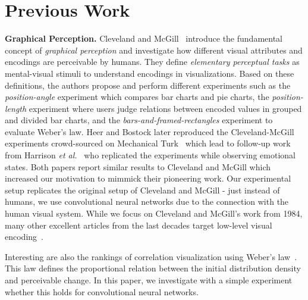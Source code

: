 \section{Previous Work}

\textbf{Graphical Perception.} Cleveland and McGill~\cite{cleveland_mcgill} introduce the fundamental concept of \emph{graphical perception} and investigate how different visual attributes and encodings are perceivable by humans. They define \emph{elementary perceptual tasks} as mental-visual stimuli to understand encodings in visualizations. Based on these definitions, the authors propose and perform different experiments such as the \emph{position-angle} experiment which compares bar charts and pie charts, the \emph{position-length} experiment where users judge relations between encoded values in grouped and divided bar charts, and the \emph{bars-and-framed-rectangles} experiment to evaluate Weber's law. Heer and Bostock later reproduced the Cleveland-McGill experiments crowd-sourced on Mechanical Turk~\cite{HeerBostock2010} which lead to follow-up work from Harrison \textit{et al.}~\cite{harrison2013influencing} who replicated the experiments while observing emotional states. Both papers report similar results to Cleveland and McGill which increased our motivation to mimmick their pioneering work. Our experimental setup replicates the original setup of Cleveland and McGill - just instead of humans, we use convolutional neural networks due to the connection with the human visual system. While we focus on Cleveland and McGill's work from 1984, many other excellent articles from the last decades target low-level visual encoding~\cite{bertin1967semiologie,cleveland1985graphical,treisman1988feature, wilkinson2006grammar, carpendale2003considering,widgor_perception2007,munzner2015visualization}.

Interesting are also the rankings of correlation visualization using Weber's law~\cite{harrison2014_webers_law_rank}. This law defines the proportional relation between the initial distribution density and perceivable change. In this paper, we investigate with a simple experiment whether this holds for convolutional neural networks.
\\~\\

